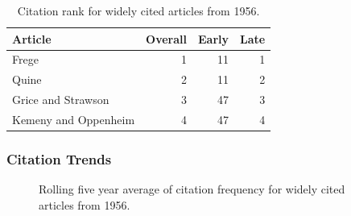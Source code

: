 \documentclass[
  10pt,
  letterpaper,
  DIV=11,
  numbers=noendperiod,
  twoside]{scrartcl}
\begin{document}
\begin{longtable}[]{@{}lrrr@{}}

\caption{\label{tbl-citation-rank-1956}Citation rank for widely cited
articles from 1956.}

\tabularnewline

\toprule\noalign{}
Article & Overall & Early & Late \\
\midrule\noalign{}
\endhead
\bottomrule\noalign{}
\endlastfoot
Frege & 1 & 11 & 1 \\
Quine & 2 & 11 & 2 \\
Grice and Strawson & 3 & 47 & 3 \\
Kemeny and Oppenheim & 4 & 47 & 4 \\

\end{longtable}

\subsubsection*{Citation Trends}\label{sec-trends-1956}

\begin{figure}


\caption{\label{fig-citation-spaghetti-1956}Rolling five year average of
citation frequency for widely cited articles from 1956.}

\end{figure}%
\end{document}
